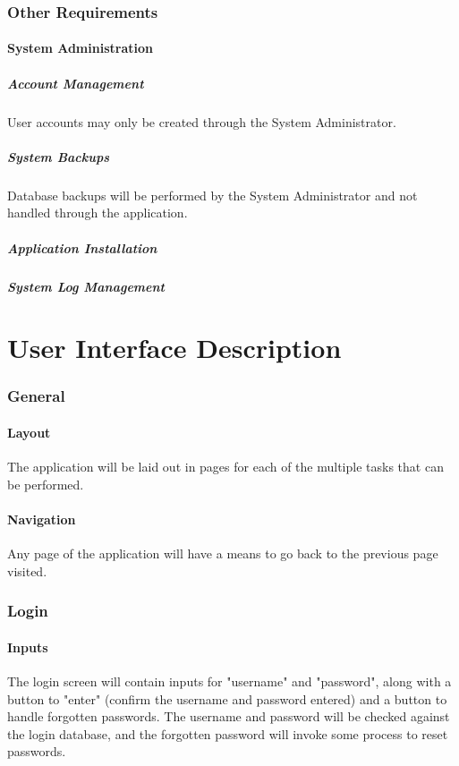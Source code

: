 \documentclass{article}
\begin{document}
\section{Other Requirements}
\subsection{System Administration}
\subsubsection{Account Management}
User accounts may only be created through the System Administrator.
\subsubsection{System Backups}
Database backups will be performed by the System Administrator and not handled
through the application.
\subsubsection{Application Installation}
\subsubsection{System Log Management}

\part{User Interface Description}

\section{General}
\subsection{Layout}
The application will be laid out in pages for each of the multiple tasks that
can be performed.
\subsection{Navigation}
Any page of the application will have a means to go back to the previous
page visited.

\section{Login}
\subsection{Inputs}
The login screen will contain inputs for "username" and "password", along with a
button to "enter" (confirm the username and password entered) and a button to handle
forgotten passwords. The username and password will be checked against the login
database, and the forgotten password will invoke some process to reset passwords.
\end{document}
